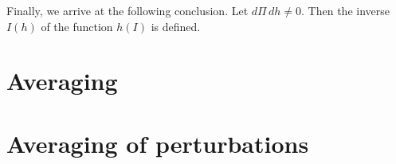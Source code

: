 \documentclass[leqno]{book}
\numberwithin{equation}{section}
\theoremstyle{plain}
\theoremstyle{definition}
\theoremstyle{remark}
\theoremstyle{smallcap}
\numberwithin{prob}{section}
\begin{document}
Finally, we arrive at the following conclusion.
%
Let $d\Pi \, dh \ne 0$.
%
Then the inverse $I(h)$ of the function $h(I)$ is defined.

\section{Averaging}

\section{Averaging of perturbations}

%
%
%
%
%
%
%
%
%
\end{document}
